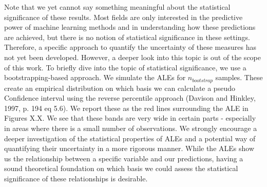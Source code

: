 Note that we yet cannot say something meaningful about the statistical significance of these results. Most fields are only interested in the predictive power of machine learning methods and in understanding how these predictions are achieved, but there is no notion of statistical significance in these settings. Therefore, a specific approach to quantify the uncertainty of these measures has not yet been developed. However, a deeper look into this topic is out of the scope of this work. To briefly dive into the topic of statistical significance, we use a bootstrapping-based approach. We simulate the ALEs for $n_{bootstrap}$ samples. These create an empirical distribution on which basis we can calculate a pseudo Confidence interval using the reverse percentile approach (Davison and Hinkley, 1997, p. 194 eq 5.6). We report these as the red lines surrounding the ALE in Figures X.X. We see that these bands are very wide in certain parts - especially in areas where there is a small number of observations. We strongly encourage a deeper investigation of the statistical properties of ALEs and a potential way of quantifying their uncertainty in a more rigorous manner. While the ALEs show us the relationship between a specific variable and our predictions, having a sound theoretical foundation on which basis we could assess the statistical significance of these relationships is desirable. 

